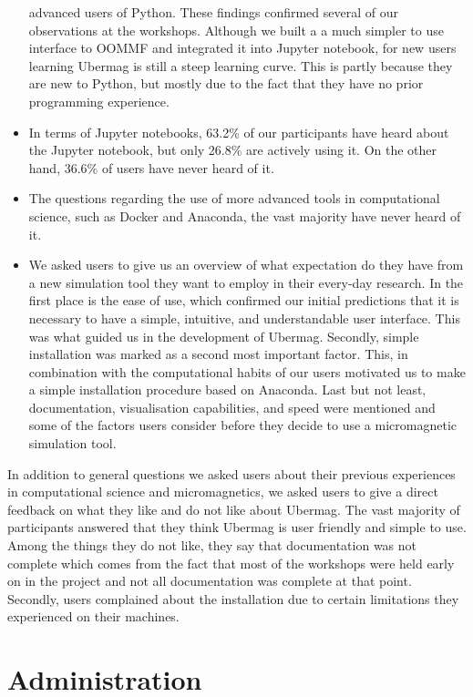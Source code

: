 \documentclass{deliverablereport}
\begin{document}
\begin{itemize}
advanced users of Python. These findings confirmed several of our
observations at the workshops. Although we built a a much simpler to
use interface to OOMMF and integrated it into Jupyter notebook, for
new users learning Ubermag is still a steep learning curve. This is
partly because they are new to Python, but mostly due to the fact that
they have no prior programming experience.
\item In terms of Jupyter notebooks, 63.2\% of our participants have
heard about the Jupyter notebook, but only 26.8\% are actively using
it. On the other hand, 36.6\% of users have never heard of it.
\item The questions regarding the use of more advanced tools in
computational science, such as Docker and Anaconda, the vast majority
have never heard of it.
  \item We asked users to give us an overview of what expectation do
they have from a new simulation tool they want to employ in their
every-day research. In the first place is the ease of use, which
confirmed our initial predictions that it is necessary to have a
simple, intuitive, and understandable user interface. This was what
guided us in the development of Ubermag. Secondly, simple installation
was marked as a second most important factor. This, in combination
with the computational habits of our users motivated us to make a
simple installation procedure based on Anaconda. Last but not least,
documentation, visualisation capabilities, and speed were mentioned
and some of the factors users consider before they decide to use a
micromagnetic simulation tool.
\end{itemize}

In addition to general questions we asked users about their previous
experiences in computational science and micromagnetics, we asked
users to give a direct feedback on what they like and do not like
about Ubermag. The vast majority of participants answered that they
think Ubermag is user friendly and simple to use. Among the things
they do not like, they say that documentation was not complete which
comes from the fact that most of the workshops were held early on in
the project and not all documentation was complete at that
point. Secondly, users complained about the installation due to
certain limitations they experienced on their machines.

\section{Administration}
\end{document}
